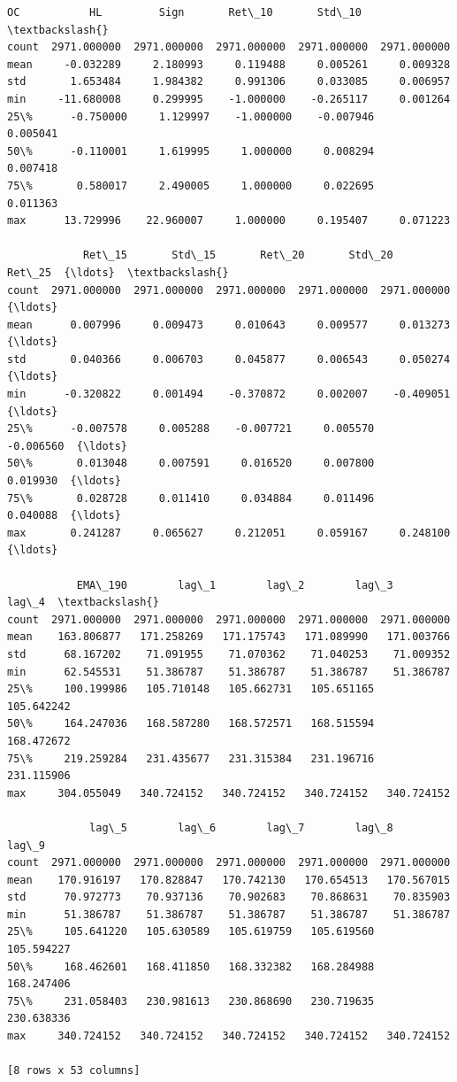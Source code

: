 \documentclass[11pt]{article}
\makeatletter
\newcommand{\boxspacing}{\kern\kvtcb@left@rule\kern\kvtcb@boxsep}
\newcommand{\prompt}[4]{
        {\ttfamily\llap{{\color{#2}[#3]:\hspace{3pt}#4}}\vspace{-\baselineskip}}
    }
\makeatother
\begin{document}
            \begin{tcolorbox}[breakable, size=fbox, boxrule=.5pt, pad at break*=1mm, opacityfill=0]
\prompt{Out}{outcolor}{26}{\boxspacing}
\begin{Verbatim}[commandchars=\\\{\}]
                OC           HL         Sign       Ret\_10       Std\_10  \textbackslash{}
count  2971.000000  2971.000000  2971.000000  2971.000000  2971.000000
mean     -0.032289     2.180993     0.119488     0.005261     0.009328
std       1.653484     1.984382     0.991306     0.033085     0.006957
min     -11.680008     0.299995    -1.000000    -0.265117     0.001264
25\%      -0.750000     1.129997    -1.000000    -0.007946     0.005041
50\%      -0.110001     1.619995     1.000000     0.008294     0.007418
75\%       0.580017     2.490005     1.000000     0.022695     0.011363
max      13.729996    22.960007     1.000000     0.195407     0.071223

            Ret\_15       Std\_15       Ret\_20       Std\_20       Ret\_25  {\ldots}  \textbackslash{}
count  2971.000000  2971.000000  2971.000000  2971.000000  2971.000000  {\ldots}
mean      0.007996     0.009473     0.010643     0.009577     0.013273  {\ldots}
std       0.040366     0.006703     0.045877     0.006543     0.050274  {\ldots}
min      -0.320822     0.001494    -0.370872     0.002007    -0.409051  {\ldots}
25\%      -0.007578     0.005288    -0.007721     0.005570    -0.006560  {\ldots}
50\%       0.013048     0.007591     0.016520     0.007800     0.019930  {\ldots}
75\%       0.028728     0.011410     0.034884     0.011496     0.040088  {\ldots}
max       0.241287     0.065627     0.212051     0.059167     0.248100  {\ldots}

           EMA\_190        lag\_1        lag\_2        lag\_3        lag\_4  \textbackslash{}
count  2971.000000  2971.000000  2971.000000  2971.000000  2971.000000
mean    163.806877   171.258269   171.175743   171.089990   171.003766
std      68.167202    71.091955    71.070362    71.040253    71.009352
min      62.545531    51.386787    51.386787    51.386787    51.386787
25\%     100.199986   105.710148   105.662731   105.651165   105.642242
50\%     164.247036   168.587280   168.572571   168.515594   168.472672
75\%     219.259284   231.435677   231.315384   231.196716   231.115906
max     304.055049   340.724152   340.724152   340.724152   340.724152

             lag\_5        lag\_6        lag\_7        lag\_8        lag\_9
count  2971.000000  2971.000000  2971.000000  2971.000000  2971.000000
mean    170.916197   170.828847   170.742130   170.654513   170.567015
std      70.972773    70.937136    70.902683    70.868631    70.835903
min      51.386787    51.386787    51.386787    51.386787    51.386787
25\%     105.641220   105.630589   105.619759   105.619560   105.594227
50\%     168.462601   168.411850   168.332382   168.284988   168.247406
75\%     231.058403   230.981613   230.868690   230.719635   230.638336
max     340.724152   340.724152   340.724152   340.724152   340.724152

[8 rows x 53 columns]
\end{Verbatim}
\end{tcolorbox}
        
\end{document}
